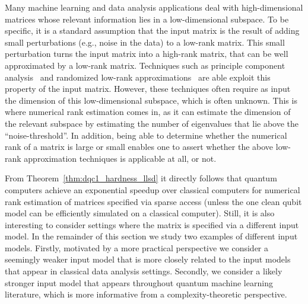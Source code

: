\documentclass[a4paper, onecolumn, accepted=2022-08-28]{quantumarticle}
\begin{document}
Many machine learning and data analysis applications deal with high-dimensional matrices whose relevant information lies in a low-dimensional subspace.
To be specific, it is a standard assumption that the input matrix is the result of adding small perturbations (e.g., noise in the data) to a low-rank matrix.
This small perturbation turns the input matrix into a high-rank matrix, that can be well approximated by a low-rank matrix. 
Techniques such as principle component analysis~\cite{jolliffe:pca} and randomized low-rank approximations~\cite{halko:random_low_rank} are able exploit this property of the input matrix.
However, these techniques often require as input the dimension of this low-dimensional subspace, which is often unknown.
This is where numerical rank estimation comes in, as it can estimate the dimension of the relevant subspace by estimating the number of eigenvalues that lie above the ``noise-threshold''.
In addition, being able to determine whether the numerical rank of a matrix is large or small enables one to assert whether the above low-rank approximation techniques is applicable at all, or not.

From Theorem~\ref{thm:dqc1_hardness_llsd} it directly follows that quantum computers achieve an exponential speedup over classical computers for numerical rank estimation of matrices specified via sparse access (unless the one clean qubit model can be efficiently simulated on a classical computer).
Still, it is also interesting to consider settings where the matrix is specified via a different input model.
In the remainder of this section we study two examples of different input models.
Firstly, motivated by a more practical perspective we consider a seemingly weaker input model that is more closely related to the input models that appear in classical data analysis settings.
Secondly, we consider a likely stronger input model that appears throughout quantum machine learning literature, which is more informative from a complexity-theoretic perspective.
\end{document}
